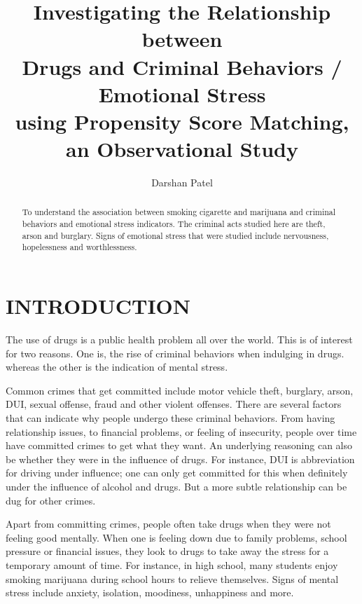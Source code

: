 \documentclass[a4paper, 10pt, conference]{ieeeconf}      %
\title{\Large \bf
Investigating the Relationship between \\ Drugs and Criminal Behaviors / Emotional Stress \\ using Propensity Score Matching, an Observational Study
}
\author{Darshan Patel}
\begin{document}
\maketitle
\thispagestyle{fancy}


\begin{abstract}

To understand the association between smoking cigarette and marijuana and criminal behaviors and emotional stress indicators. The criminal acts studied here are theft, arson and burglary. Signs of emotional stress that were studied include nervousness, hopelessness and worthlessness. 

\end{abstract}


\section{INTRODUCTION}

The use of drugs is a public health problem all over the world. This is of interest for two reasons. One is, the rise of criminal behaviors when indulging in drugs. whereas the other is the indication of mental stress. 

Common crimes that get committed include motor vehicle theft, burglary, arson, DUI, sexual offense, fraud and other violent offenses. There are several factors that can indicate why people undergo these criminal behaviors. From having relationship issues, to financial problems, or feeling of insecurity, people over time have committed crimes to get what they want. An underlying reasoning can also be whether they were in the influence of drugs. For instance, DUI is abbreviation for driving under influence; one can only get committed for this when definitely under the influence of alcohol and drugs. But a more subtle relationship can be dug for other crimes. 

Apart from committing crimes, people often take drugs when they were not feeling good mentally. When one is feeling down due to family problems, school pressure or financial issues, they look to drugs to take away the stress for a temporary amount of time. For instance, in high school, many students enjoy smoking marijuana during school hours to relieve themselves. Signs of mental stress include anxiety, isolation, moodiness, unhappiness and more. 
\end{document}
